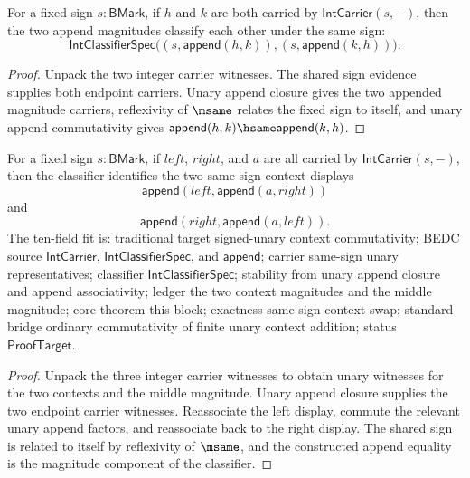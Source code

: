 \begin{theorem}
\label{thm:int-classifier-append-comm-same-sign}
For a fixed sign \(s:\mathsf{BMark}\), if \(h\) and \(k\) are both carried by
\(\mathsf{IntCarrier}(s,-)\), then the two append magnitudes classify each
other under the same sign:
$$
\mathsf{IntClassifierSpec}\bigl((s,\mathsf{append}(h,k)),
(s,\mathsf{append}(k,h))\bigr).
$$
\end{theorem}
\begin{proof}
Unpack the two integer carrier witnesses. The shared sign evidence supplies
both endpoint carriers. Unary append closure gives the two appended magnitude
carriers, reflexivity of \(\msame\) relates the fixed sign to itself, and
unary append commutativity gives
\(\mathsf{append}(h,k)\hsame\mathsf{append}(k,h)\).
\end{proof}

\begin{theorem}
\label{thm:int-classifier-append-context-swap-same-sign}
For a fixed sign \(s:\mathsf{BMark}\), if \(left\), \(right\), and \(a\) are
all carried by \(\mathsf{IntCarrier}(s,-)\), then the classifier identifies the
two same-sign context displays
$$
\mathsf{append}(left,\mathsf{append}(a,right))
$$
and
$$
\mathsf{append}(right,\mathsf{append}(a,left)).
$$
The ten-field fit is: traditional target signed-unary context commutativity;
BEDC source \(\mathsf{IntCarrier}\), \(\mathsf{IntClassifierSpec}\), and
\(\mathsf{append}\); carrier same-sign unary representatives; classifier
\(\mathsf{IntClassifierSpec}\); stability from unary append closure and append
associativity; ledger the two context magnitudes and the middle magnitude;
core theorem this block; exactness same-sign context swap; standard bridge
ordinary commutativity of finite unary context addition; status
\(\mathsf{ProofTarget}\).
\end{theorem}
\begin{proof}
Unpack the three integer carrier witnesses to obtain unary witnesses for the
two contexts and the middle magnitude. Unary append closure supplies the two
endpoint carrier witnesses. Reassociate the left display, commute the relevant
unary append factors, and reassociate back to the right display. The shared
sign is related to itself by reflexivity of \(\msame\), and the constructed
append equality is the magnitude component of the classifier.
\end{proof}

